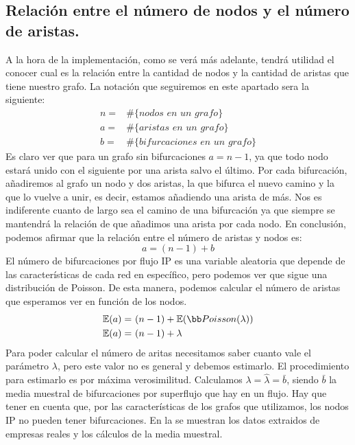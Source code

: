 \documentclass[twoside, 12pt]{epstfg}
\begin{document}
\subsection{Relación entre el número de nodos y el número de aristas.}
\label{sec:Analisis:Edges per node}
A la hora de la implementación, como se verá más adelante, tendrá utilidad el conocer cual es la relación entre la cantidad de nodos y la cantidad de aristas que tiene nuestro grafo. La notación que seguiremos en este apartado sera la siguiente:
\begin{align*}
	n =& \mathbin{\#}\{\textit{nodos en un grafo}\} \\
	a =& \mathbin{\#}\{\textit{aristas en un grafo}\} \\
	b =& \mathbin{\#}\{\textit{bifurcaciones en un grafo}\}
\end{align*}
Es claro ver que para un grafo sin bifurcaciones \(a = n-1\), ya que todo nodo estará unido con el siguiente por una arista salvo el último. Por cada bifurcación, añadiremos al grafo un nodo y dos aristas, la que bifurca el nuevo camino y la que lo vuelve a unir, es decir, estamos añadiendo una arista de más. Nos es indiferente cuanto de largo sea el camino de una bifurcación ya que siempre se mantendrá la relación de que añadimos una arista por cada nodo. En conclusión, podemos afirmar que la relación entre el número de aristas y nodos es:
\begin{equation*}
    a = (n - 1) + b
\end{equation*}
El número de bifurcaciones por flujo IP es una variable aleatoria que depende de las características de cada red en específico, pero podemos ver que sigue una distribución de Poisson. De esta manera, podemos calcular el número de aristas que esperamos ver en función de los nodos. 
\begin{align*}
    \mathbb{E}(a) =&\ (n - 1) + \mathbb{E}(\bb Poisson(\lambda))\\
    \mathbb{E}(a) =&\ (n - 1) + \lambda
\end{align*}
Para poder calcular el número de aritas necesitamos saber cuanto vale el parámetro $\lambda$, pero este valor no es general y debemos estimarlo. El procedimiento para estimarlo es por máxima verosimilitud. Calculamos $\lambda = \widehat{\lambda} = \bar{b}$, siendo $\bar{b}$ la media muestral de bifurcaciones por superflujo que hay en un flujo. Hay que tener en cuenta que, por las características de los grafos que utilizamos, los nodos IP no pueden tener bifurcaciones. En la  se muestran los datos extraidos de empresas reales y los cálculos de la media muestral.
\end{document}
